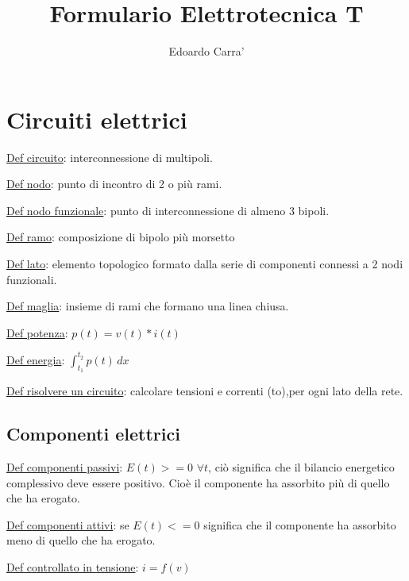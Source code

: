 \documentclass{article}
\title{Formulario Elettrotecnica T}
\author{Edoardo Carra'}
\begin{document}
\maketitle

\section{Circuiti elettrici}
\noindent \underline{Def circuito}: interconnessione di multipoli.

\noindent \underline{Def nodo}: punto di incontro di 2 o più rami.

\noindent \underline{Def nodo funzionale}: punto di interconnessione di almeno 3 bipoli.

\noindent \underline{Def ramo}: composizione di bipolo più morsetto

\noindent \underline{Def lato}: elemento topologico formato dalla serie di componenti connessi a 2 nodi funzionali.

\noindent \underline{Def maglia}: insieme di rami che formano una linea chiusa.

\noindent \underline{Def potenza}: $p(t)=v(t)*i(t)$

\noindent \underline{Def energia}: $\int_{t_1}^{t_2} p(t) \,dx$

\noindent \underline{Def risolvere un circuito}: calcolare tensioni e correnti (to),per ogni lato della rete.


\medskip
\noindent{}

\subsection{Componenti elettrici}
\noindent \underline{Def componenti passivi}: $E(t) >= 0$  $\forall t$, ciò significa che il bilancio energetico complessivo deve essere positivo.
Cioè il componente ha assorbito più di quello che ha erogato.

\noindent \underline{Def componenti attivi}: se $E(t) <= 0 $ significa che il componente ha assorbito meno di quello che ha erogato.

\noindent \underline{Def controllato in tensione}: $i=f(v)$
\end{document}
